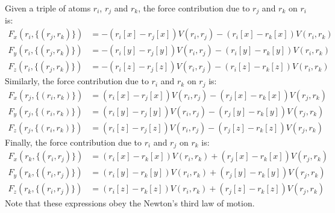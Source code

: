 \documentclass[letterpaper,12pt]{article}
\begin{document}
Given a triple of atoms $r_i$, $r_j$ and $r_k$, the force contribution
due to $r_j$ and $r_k$ on $r_i$ is:
\begin{align*}
F_x(r_i, \{ (r_j, r_k) \}) &= -(r_i[x] - r_j[x]) V(r_i, r_j) - (r_i[x]
- r_k[x]) V(r_i, r_k)\\
F_y(r_i, \{ (r_j, r_k) \}) &= -(r_i[y] - r_j[y]) V(r_i, r_j) - (r_i[y]
- r_k[y]) V(r_i, r_k)\\
F_z(r_i, \{ (r_j, r_k) \}) &= -(r_i[z] - r_j[z]) V(r_i, r_j) - (r_i[z]
- r_k[z]) V(r_i, r_k)
\end{align*}
Similarly, the force contribution due to $r_i$ and $r_k$ on $r_j$ is:
\begin{align*}
F_x(r_j, \{ (r_i, r_k) \}) &= (r_i[x] - r_j[x]) V(r_i, r_j) - (r_j[x]
- r_k[x]) V(r_j, r_k)\\
F_y(r_j, \{ (r_i, r_k) \}) &= (r_i[y] - r_j[y]) V(r_i, r_j) - (r_j[y]
- r_k[y]) V(r_j, r_k)\\
F_z(r_j, \{ (r_i, r_k) \}) &= (r_i[z] - r_j[z]) V(r_i, r_j) - (r_j[z]
- r_k[z]) V(r_j, r_k)
\end{align*}
Finally, the force contribution due to $r_i$ and $r_j$ on $r_k$ is:
\begin{align*}
F_x(r_k, \{ (r_i, r_j) \}) &= (r_i[x] - r_k[x]) V(r_i, r_k) + (r_j[x]
- r_k[x]) V(r_j, r_k)\\
F_y(r_k, \{ (r_i, r_j) \}) &= (r_i[y] - r_k[y]) V(r_i, r_k) + (r_j[y]
- r_k[y]) V(r_j, r_k)\\
F_z(r_k, \{(r_i, r_j) \}) &= (r_i[z] - r_k[z]) V(r_i, r_k) + (r_j[z] -
r_k[z]) V(r_j, r_k)
\end{align*}
Note that these expressions obey the Newton's third law of motion.
\end{document}
